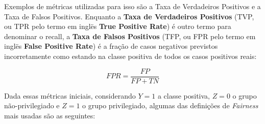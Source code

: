 \documentclass[portugues]{ic-tese}
\begin{document}
Exemplos de métricas utilizadas para isso são a Taxa de Verdadeiros Positivos e a Taxa de Falsos Positivos. Enquanto a \textbf{Taxa de Verdadeiros Positivos} (TVP, ou TPR pelo termo em inglës \textbf{True Positive Rate}) é outro termo para denominar o recall, a \textbf{Taxa de Falsos Positivos} (TFP, ou FPR pelo termo em inglës \textbf{False Positive Rate}) é a fração de casos negativos previstos incorretamente como estando na classe positiva de todos os casos positivos reais:

\begin{equation}
FPR = \frac{FP}{FP + TN}
\end{equation}

Dada essas métricas iniciais, considerando $Y=1$ a classe positiva, $Z=0$ o grupo não-privilegiado e $Z=1$ o grupo privilegiado, algumas das definições de \textit{Fairness} mais usadas são as seguintes:
\end{document}
